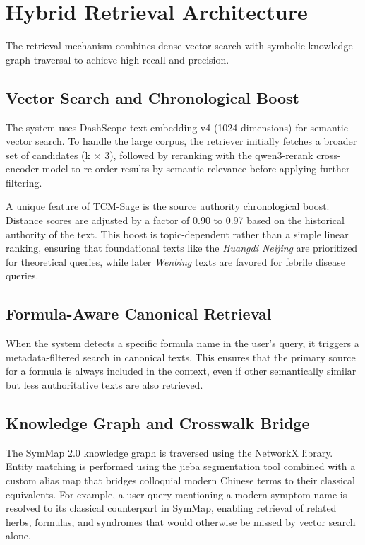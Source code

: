 \section{Hybrid Retrieval Architecture}

The retrieval mechanism combines dense vector search with symbolic knowledge graph traversal to achieve high recall and precision.

\subsection{Vector Search and Chronological Boost}

The system uses DashScope text-embedding-v4 (1024 dimensions) for semantic vector search. To handle the large corpus, the retriever initially fetches a broader set of candidates (k $\times$ 3), followed by reranking with the qwen3-rerank cross-encoder model to re-order results by semantic relevance before applying further filtering.

A unique feature of TCM-Sage is the source authority chronological boost. Distance scores are adjusted by a factor of 0.90 to 0.97 based on the historical authority of the text. This boost is topic-dependent rather than a simple linear ranking, ensuring that foundational texts like the \textit{Huangdi Neijing} are prioritized for theoretical queries, while later \textit{Wenbing} texts are favored for febrile disease queries.

\subsection{Formula-Aware Canonical Retrieval}

When the system detects a specific formula name in the user's query, it triggers a metadata-filtered search in canonical texts. This ensures that the primary source for a formula is always included in the context, even if other semantically similar but less authoritative texts are also retrieved.

\subsection{Knowledge Graph and Crosswalk Bridge}

The SymMap 2.0 knowledge graph is traversed using the NetworkX library. Entity matching is performed using the jieba segmentation tool combined with a custom alias map that bridges colloquial modern Chinese terms to their classical equivalents. For example, a user query mentioning a modern symptom name is resolved to its classical counterpart in SymMap, enabling retrieval of related herbs, formulas, and syndromes that would otherwise be missed by vector search alone.

